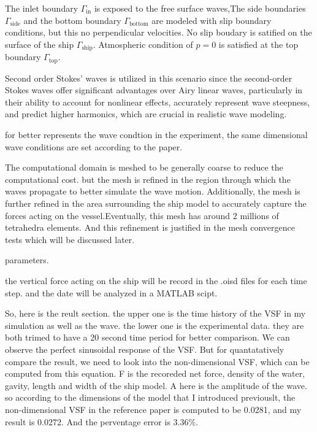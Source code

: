 \documentclass[17pt]{extarticle} %
\begin{document}
The inlet boundary \(\Gamma_{\text{in}}\) is exposed to the free surface waves,The side boundaries \(\Gamma_{\text{side}}\) and the bottom boundary 
\(\Gamma_{\text{bottom}}\) are modeled with slip boundary conditions, but this no perpendicular velocities.
No slip boudary is satified on the surface of the ship \(\Gamma_{\text{ship}}\). 
Atmospheric condition of \(p = 0\) is satisfied at the top boundary \(\Gamma_{\text{top}}\).

Second order Stokes' waves is utilized in this scenario since the second-order Stokes waves offer significant advantages over Airy linear 
waves, particularly in their ability to account for nonlinear effects,  accurately represent wave 
steepness, and predict higher harmonics, which are crucial in realistic wave modeling.

for better represents the wave condtion in the experiment, the same dimensional wave conditions are set according to the paper.

The computational domain is meshed to be generally coarse to reduce the computational cost.
but the mesh is refined in the region through which the waves 
propagate to better simulate the wave motion. Additionally, the mesh is further refined in the area surrounding 
the ship model to accurately capture the forces acting on the vessel.Eventually, this mesh has around 2 millions of tetrahedra elements.
And this refinement is justified in the mesh convergence tests which will be discussed later.

parameters.

the vertical force acting on the ship will be record in the .oisd files for each time step.
and the date will be analyzed in a MATLAB scipt.

So, here is the reult section. the upper one is the time history of the VSF in my simulation as well as
the wave. the lower one is the  experimental data. they are both trimed to have a 20 second time period
for better comparison.  We can observe the perfect sinusoidal response of the VSF. But for quantatatively 
compare the result, we need to look into the non-dimensional VSF, which can be computed from this equation.
F is the recoreded net force, density of the water, gavity, length and width of the ship model. A here is the
amplitude of the wave. so according to the dimensions of the model that I introduced previouslt, the non-dimensional
VSF in the reference paper is computed to  be 0.0281, and my result is 0.0272. And the perventage error is 
3.36\%.
\end{document}
